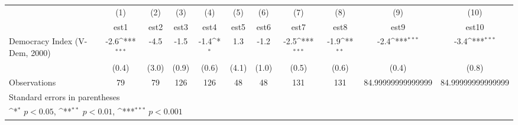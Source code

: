 {
\def\sym#1{\ifmmode^{#1}\else\(^{#1}\)\fi}
\begin{tabular}{l*{10}{c}}
\hline\hline
                    &\multicolumn{1}{c}{(1)}         &\multicolumn{1}{c}{(2)}         &\multicolumn{1}{c}{(3)}         &\multicolumn{1}{c}{(4)}         &\multicolumn{1}{c}{(5)}         &\multicolumn{1}{c}{(6)}         &\multicolumn{1}{c}{(7)}         &\multicolumn{1}{c}{(8)}         &\multicolumn{1}{c}{(9)}         &\multicolumn{1}{c}{(10)}         \\
                    &        est1         &        est2         &        est3         &        est4         &        est5         &        est6         &        est7         &        est8         &        est9         &       est10         \\
\hline
Democracy Index (V-Dem, 2000)&        -2.6\sym{***}&        -4.5         &        -1.5         &        -1.4\sym{*}  &         1.3         &        -1.2         &        -2.5\sym{***}&        -1.9\sym{**} &        -2.4\sym{***}&        -3.4\sym{***}\\
                    &       (0.4)         &       (3.0)         &       (0.9)         &       (0.6)         &       (4.1)         &       (1.0)         &       (0.5)         &       (0.6)         &       (0.4)         &       (0.8)         \\
\hline
Observations        &          79         &          79         &         126         &         126         &          48         &          48         &         131         &         131         &84.99999999999999         &84.99999999999999         \\
\hline\hline
\multicolumn{11}{l}{\footnotesize Standard errors in parentheses}\\
\multicolumn{11}{l}{\footnotesize \sym{*} \(p<0.05\), \sym{**} \(p<0.01\), \sym{***} \(p<0.001\)}\\
\end{tabular}
}
